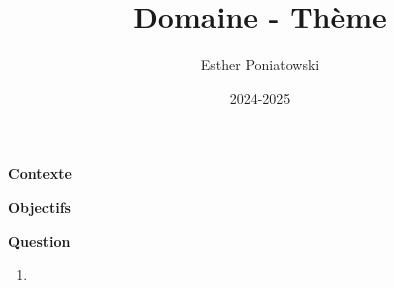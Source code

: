 \documentclass[10pt,a4paper]{article}
\title{Domaine - Thème}
\author{Esther Poniatowski}
\date{2024-2025}
\begin{document}
\textbf{Contexte}


\bigskip
\textbf{Objectifs}



\q \textbf{Question}

\begin{enumerate}
    \item
\end{enumerate}
\end{document}
